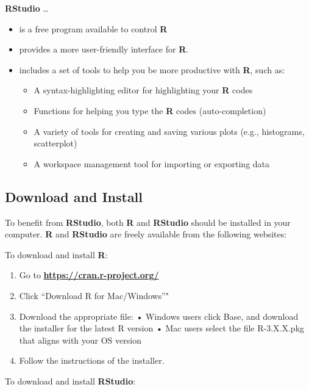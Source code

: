 \documentclass[]{book}
\providecommand{\tightlist}{%
  \setlength{\itemsep}{0pt}\setlength{\parskip}{0pt}}
\begin{document}
\textbf{RStudio} \ldots{}

\begin{itemize}
\tightlist
\item
  is a free program available to control \textbf{R}
\item
  provides a more user-friendly interface for \textbf{R}.
\item
  includes a set of tools to help you be more productive with \textbf{R}, such as:

  \begin{itemize}
  \tightlist
  \item
    A syntax-highlighting editor for highlighting your \textbf{R} codes
  \item
    Functions for helping you type the \textbf{R} codes (auto-completion)
  \item
    A variety of tools for creating and saving various plots (e.g., histograms, scatterplot)
  \item
    A workspace management tool for importing or exporting data
  \end{itemize}
\end{itemize}

\hypertarget{download-and-install}{%
\subsection{Download and Install}\label{download-and-install}}

To benefit from \textbf{RStudio}, both \textbf{R} and \textbf{RStudio} should be installed in your computer. \textbf{R} and \textbf{RStudio} are freely available from the following websites:

To download and install \textbf{R}:

\begin{enumerate}
\def\labelenumi{\arabic{enumi}.}
\tightlist
\item
  Go to \href{https://cran.r-project.org/}{\textbf{https://cran.r-project.org/}}
\item
  Click ``Download R for Mac/Windows''"
\item
  Download the appropriate file:
  • Windows users click Base, and download the installer for the latest R version
  • Mac users select the file R-3.X.X.pkg that aligns with your OS version
\item
  Follow the instructions of the installer.
\end{enumerate}

To download and install \textbf{RStudio}:
\end{document}
